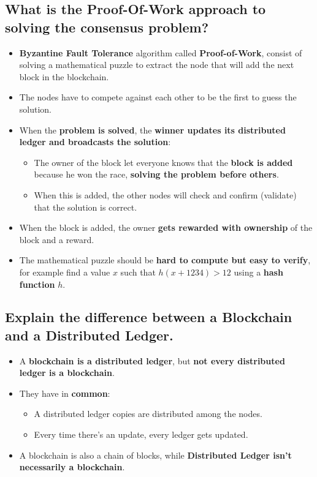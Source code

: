 \documentclass[9pt, letterpaper]{article}
\begin{document}
\subsection{What is the Proof-Of-Work approach to solving the consensus problem?}
\begin{itemize}
	\item \textbf{Byzantine Fault Tolerance} algorithm called \textbf{Proof-of-Work}, consist of solving a mathematical puzzle to extract the node that will add the next block in the blockchain.
	\item The nodes have to compete against each other to be the first to guess the solution.
	\item When the \textbf{problem is solved}, the \textbf{winner updates its distributed ledger and broadcasts the solution}:
	      \begin{itemize}
		      \item The owner of the block let everyone knows that the \textbf{block is added} because he won the race, \textbf{solving the problem before others}.
		      \item When this is added, the other nodes will check and confirm (validate) that the solution is correct.
	      \end{itemize}
	\item When the block is added, the owner \textbf{gets rewarded with ownership} of the block and a reward.
	\item The mathematical puzzle should be \textbf{hard to compute but easy to verify}, for example find a value $x$ such that $h(x+1234) > 12$ using a \textbf{hash function} $h$.
\end{itemize}

\subsection{Explain the difference between a Blockchain and a Distributed Ledger.}
\begin{itemize}
	\item A \textbf{blockchain is a distributed ledger}, but \textbf{not every distributed ledger is a blockchain}.
	\item They have in \textbf{common}:
	      \begin{itemize}
		      \item A distributed ledger copies are distributed among the nodes.
		      \item Every time there's an update, every ledger gets updated.
	      \end{itemize}
	\item A blockchain is also a chain of blocks, while \textbf{Distributed Ledger isn't necessarily a blockchain}.
\end{itemize}
\end{document}
